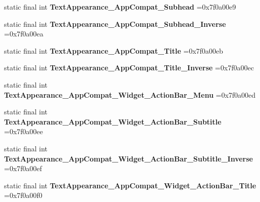 \begin{DoxyCompactItemize}
static final int {\bfseries Text\+Appearance\+\_\+\+App\+Compat\+\_\+\+Subhead} =0x7f0a00e9
\item 
\mbox{\label{classproject4_1_1xaria_1_1R_1_1style_a36f685d1f597815dc4fb6363553f504c}} 
static final int {\bfseries Text\+Appearance\+\_\+\+App\+Compat\+\_\+\+Subhead\+\_\+\+Inverse} =0x7f0a00ea
\item 
\mbox{\label{classproject4_1_1xaria_1_1R_1_1style_ae648f246ddb467e51a30f4a7924d3670}} 
static final int {\bfseries Text\+Appearance\+\_\+\+App\+Compat\+\_\+\+Title} =0x7f0a00eb
\item 
\mbox{\label{classproject4_1_1xaria_1_1R_1_1style_ada35b20a30fd97565ffb335e6184d9c9}} 
static final int {\bfseries Text\+Appearance\+\_\+\+App\+Compat\+\_\+\+Title\+\_\+\+Inverse} =0x7f0a00ec
\item 
\mbox{\label{classproject4_1_1xaria_1_1R_1_1style_a218f294ff0c4b55f72295b3063986b26}} 
static final int {\bfseries Text\+Appearance\+\_\+\+App\+Compat\+\_\+\+Widget\+\_\+\+Action\+Bar\+\_\+\+Menu} =0x7f0a00ed
\item 
\mbox{\label{classproject4_1_1xaria_1_1R_1_1style_a9a1a02f35c8adada6183c820543bf141}} 
static final int {\bfseries Text\+Appearance\+\_\+\+App\+Compat\+\_\+\+Widget\+\_\+\+Action\+Bar\+\_\+\+Subtitle} =0x7f0a00ee
\item 
\mbox{\label{classproject4_1_1xaria_1_1R_1_1style_a356eb1b3a0d3c0ed6839df6313fdd1b2}} 
static final int {\bfseries Text\+Appearance\+\_\+\+App\+Compat\+\_\+\+Widget\+\_\+\+Action\+Bar\+\_\+\+Subtitle\+\_\+\+Inverse} =0x7f0a00ef
\item 
\mbox{\label{classproject4_1_1xaria_1_1R_1_1style_aa819d1c034463e4cb090b354fccb8b9c}} 
static final int {\bfseries Text\+Appearance\+\_\+\+App\+Compat\+\_\+\+Widget\+\_\+\+Action\+Bar\+\_\+\+Title} =0x7f0a00f0
\item 
\mbox{\label{classproject4_1_1xaria_1_1R_1_1style_a562961fee0941a61b8ca4bac96397035}} 

\end{DoxyCompactItemize}
